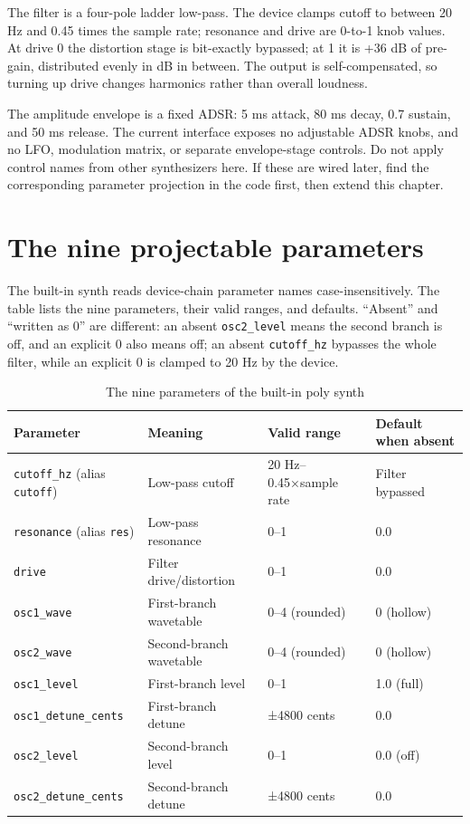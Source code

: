 The filter is a four-pole ladder low-pass. The device clamps cutoff to between
20 Hz and 0.45 times the sample rate; resonance and drive are 0-to-1 knob values.
At drive 0 the distortion stage is bit-exactly bypassed; at 1 it is +36 dB of
pre-gain, distributed evenly in dB in between. The output is self-compensated, so
turning up drive changes harmonics rather than overall loudness.

The amplitude envelope is a fixed ADSR: 5 ms attack, 80 ms decay, 0.7 sustain,
and 50 ms release. The current interface exposes no adjustable ADSR knobs, and no
LFO, modulation matrix, or separate envelope-stage controls. Do not apply control
names from other synthesizers here. If these are wired later, find the
corresponding parameter projection in the code first, then extend this chapter.

\section{The nine projectable parameters}

The built-in synth reads device-chain parameter names case-insensitively. The
table lists the nine parameters, their valid ranges, and defaults. ``Absent'' and
``written as 0'' are different: an absent \texttt{osc2\_level} means the second
branch is off, and an explicit 0 also means off; an absent \texttt{cutoff\_hz}
bypasses the whole filter, while an explicit 0 is clamped to 20 Hz by the device.

\begin{table}[htbp]
\centering
\small
\begin{tabular}{@{}llll@{}}
\hline
Parameter & Meaning & Valid range & Default when absent \\
\hline
\texttt{cutoff\_hz} (alias \texttt{cutoff}) & Low-pass cutoff & 20 Hz--0.45×sample rate & Filter bypassed \\
\texttt{resonance} (alias \texttt{res}) & Low-pass resonance & 0--1 & 0.0 \\
\texttt{drive} & Filter drive/distortion & 0--1 & 0.0 \\
\texttt{osc1\_wave} & First-branch wavetable & 0--4 (rounded) & 0 (hollow) \\
\texttt{osc2\_wave} & Second-branch wavetable & 0--4 (rounded) & 0 (hollow) \\
\texttt{osc1\_level} & First-branch level & 0--1 & 1.0 (full) \\
\texttt{osc1\_detune\_cents} & First-branch detune & ±4800 cents & 0.0 \\
\texttt{osc2\_level} & Second-branch level & 0--1 & 0.0 (off) \\
\texttt{osc2\_detune\_cents} & Second-branch detune & ±4800 cents & 0.0 \\
\hline
\end{tabular}
\caption{The nine parameters of the built-in poly synth}
\label{tab:synth-params}
\end{table}

